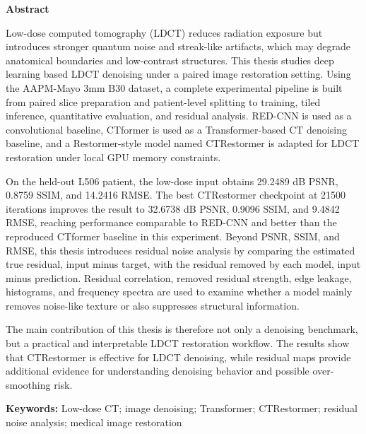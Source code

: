 \centerline{\xiaoyi\bfseries Abstract}
\vspace{4em}

Low-dose computed tomography (LDCT) reduces radiation exposure but introduces stronger quantum noise and streak-like artifacts, which may degrade anatomical boundaries and low-contrast structures. This thesis studies deep learning based LDCT denoising under a paired image restoration setting. Using the AAPM-Mayo 3mm B30 dataset, a complete experimental pipeline is built from paired slice preparation and patient-level splitting to training, tiled inference, quantitative evaluation, and residual analysis. RED-CNN is used as a convolutional baseline, CTformer is used as a Transformer-based CT denoising baseline, and a Restormer-style model named CTRestormer is adapted for LDCT restoration under local GPU memory constraints.

On the held-out L506 patient, the low-dose input obtains 29.2489 dB PSNR, 0.8759 SSIM, and 14.2416 RMSE. The best CTRestormer checkpoint at 21500 iterations improves the result to 32.6738 dB PSNR, 0.9096 SSIM, and 9.4842 RMSE, reaching performance comparable to RED-CNN and better than the reproduced CTformer baseline in this experiment. Beyond PSNR, SSIM, and RMSE, this thesis introduces residual noise analysis by comparing the estimated true residual, input minus target, with the residual removed by each model, input minus prediction. Residual correlation, removed residual strength, edge leakage, histograms, and frequency spectra are used to examine whether a model mainly removes noise-like texture or also suppresses structural information.

The main contribution of this thesis is therefore not only a denoising benchmark, but a practical and interpretable LDCT restoration workflow. The results show that CTRestormer is effective for LDCT denoising, while residual maps provide additional evidence for understanding denoising behavior and possible over-smoothing risk.

\vspace{1em}
\noindent\textbf{Keywords:} Low-dose CT; image denoising; Transformer; CTRestormer; residual noise analysis; medical image restoration

